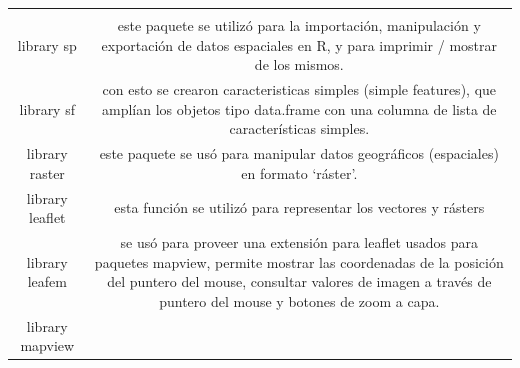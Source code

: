 \documentclass[11pt,]{article}
\begin{document}
\begin{longtable}[]{@{}cc@{}}
\begin{minipage}[t]{0.83\columnwidth}
\end{minipage}\tabularnewline
\begin{minipage}[t]{0.11\columnwidth}\centering\strut
library sp\strut
\end{minipage} & \begin{minipage}[t]{0.83\columnwidth}\centering\strut
este paquete se utilizó para la importación, manipulación y exportación
de datos espaciales en R, y para imprimir / mostrar de los mismos.\strut
\end{minipage}\tabularnewline
\begin{minipage}[t]{0.11\columnwidth}\centering\strut
library sf\strut
\end{minipage} & \begin{minipage}[t]{0.83\columnwidth}\centering\strut
con esto se crearon caracteristicas simples (simple features), que
amplían los objetos tipo data.frame con una columna de lista de
características simples.\strut
\end{minipage}\tabularnewline
\begin{minipage}[t]{0.11\columnwidth}\centering\strut
library raster\strut
\end{minipage} & \begin{minipage}[t]{0.83\columnwidth}\centering\strut
este paquete se usó para manipular datos geográficos (espaciales) en
formato `ráster'.\strut
\end{minipage}\tabularnewline
\begin{minipage}[t]{0.11\columnwidth}\centering\strut
library leaflet\strut
\end{minipage} & \begin{minipage}[t]{0.83\columnwidth}\centering\strut
esta función se utilizó para representar los vectores y rásters\strut
\end{minipage}\tabularnewline
\begin{minipage}[t]{0.11\columnwidth}\centering\strut
library leafem\strut
\end{minipage} & \begin{minipage}[t]{0.83\columnwidth}\centering\strut
se usó para proveer una extensión para leaflet usados para paquetes
mapview, permite mostrar las coordenadas de la posición del puntero del
mouse, consultar valores de imagen a través de puntero del mouse y
botones de zoom a capa.\strut
\end{minipage}\tabularnewline
\begin{minipage}[t]{0.11\columnwidth}\centering\strut
library mapview\strut
\end{minipage} & \begin{minipage}[t]{0.83\columnwidth}\centering\strut

\end{minipage}
\end{longtable}
\end{document}
